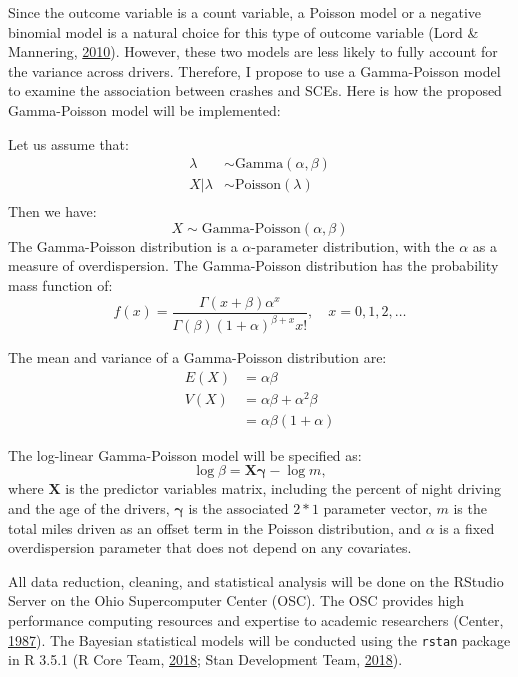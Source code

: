 \documentclass[12pt]{book}
\numberwithin{equation}{chapter}
\begin{document}
Since the outcome variable is a count variable, a Poisson model or a negative binomial model is a natural choice for this type of outcome variable (Lord \& Mannering, \protect\hyperlink{ref-lord2010statistical}{2010}). However, these two models are less likely to fully account for the variance across drivers. Therefore, I propose to use a Gamma-Poisson model to examine the association between crashes and SCEs. Here is how the proposed Gamma-Poisson model will be implemented:

Let us assume that:
\[
\begin{aligned}
\lambda & \sim \text{Gamma}(\alpha, \beta)\\
X|\lambda & \sim \text{Poisson}(\lambda)\\
\end{aligned}
\]
Then we have:
\[X \sim \text{Gamma-Poisson}(\alpha, \beta)\]
The Gamma-Poisson distribution is a \(\alpha\)-parameter distribution, with the \(\alpha\) as a measure of overdispersion. The Gamma-Poisson distribution has the probability mass function of:
\[f(x) = \frac{\Gamma(x + \beta)\alpha^x}{\Gamma(\beta)(1 + \alpha)^{\beta + x}x!}, \quad x = 0, 1, 2, \dots\]

The mean and variance of a Gamma-Poisson distribution are:
\[
\begin{aligned}
E(X) & = \alpha\beta \\
V(X) & = \alpha\beta + \alpha^2\beta\\
     & = \alpha\beta(1 + \alpha)
\end{aligned}
\]

The log-linear Gamma-Poisson model will be specified as:
\[
\log\beta = \mathbf{X\gamma} - \log m,
\]
where \(\mathbf{X}\) is the predictor variables matrix, including the percent of night driving and the age of the drivers, \(\mathbf{\gamma}\) is the associated \(2*1\) parameter vector, \(m\) is the total miles driven as an offset term in the Poisson distribution, and \(\alpha\) is a fixed overdispersion parameter that does not depend on any covariates.

All data reduction, cleaning, and statistical analysis will be done on the RStudio Server on the Ohio Supercomputer Center (OSC). The OSC provides high performance computing resources and expertise to academic researchers (Center, \protect\hyperlink{ref-OSC1987}{1987}). The Bayesian statistical models will be conducted using the \texttt{rstan} package in R 3.5.1 (R Core Team, \protect\hyperlink{ref-Rcitation}{2018}; Stan Development Team, \protect\hyperlink{ref-rstancitation}{2018}).
\end{document}
